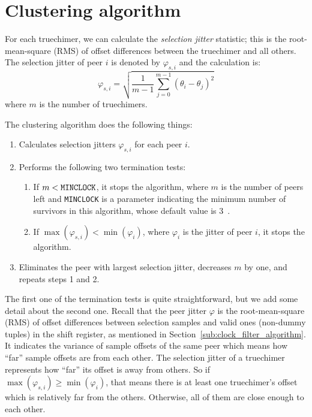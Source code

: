 \section{Clustering algorithm}%
\label{sec:clustering_algorithm}
For each truechimer, we can calculate the \emph{selection jitter} statistic;
this is the root-mean-square (RMS) of offset differences between the truechimer
and all others. The selection jitter of peer $i$ is denoted by $\varphi_{s,i}$
and the calculation is:
\begin{equation}
    \varphi_{s,i} = \sqrt{\frac{1}{m-1} \sum^{m-1}_{j=0} (\theta_i -
    \theta_j)^2 }
    \label{eq:selection_jitter}
\end{equation}
where $m$ is the number of truechimers.

The clustering algorithm does the following things:
\begin{enumerate}
    \item Calculates selection jitters $\varphi_{s, i}$ for each peer $i$.
    \item Performs the following two termination tests:
        \begin{enumerate}
            \item If $m < \verb|MINCLOCK|$, it stops the algorithm, where $m$ is
                the number of peers left and \verb|MINCLOCK| is a parameter
                indicating the minimum number of survivors in this algorithm,
                whose default value is 3~\cite{rfc5905}.
            \item If $\max(\varphi_{s,i}) < \min(\varphi_i)$, where
                $\varphi_i$ is the jitter of peer $i$, it stops the
                algorithm.
        \end{enumerate}
    \item Eliminates the peer with largest selection jitter, decreases $m$
        by one, and repeats steps 1 and 2.
\end{enumerate}
The first one of the termination tests is quite straightforward, but we add some
detail about the second one. Recall that the peer jitter $\varphi$ is the
root-mean-square (RMS) of offset differences between selection samples and
valid ones (non-dummy tuples) in the shift register, as mentioned in
Section~\ref{sub:clock_filter_algorithm}. It indicates the variance of sample
offsets of the same peer which means how ``far'' sample offsets are from each
other.
The selection jitter of a truechimer represents how ``far'' its offset is away from
others.  So if $\max(\varphi_{s,i}) \ge \min(\varphi_i)$, that means there is at
least one truechimer's offset which is relatively far from the others. Otherwise,
all of them are close enough to each other.

